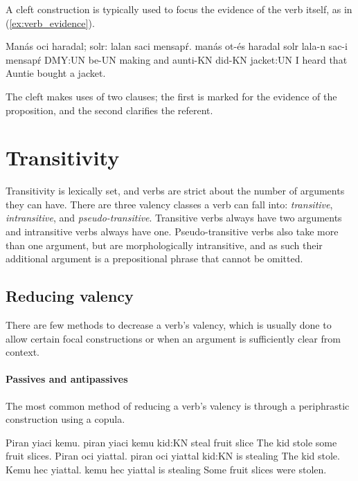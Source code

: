 A cleft construction is typically used to focus the evidence of the verb itself, as in (\ref{ex:verb_evidence}).

\begin{example}
	\label{ex:verb_evidence}
	\script Manás oci haradal; solr: lalan saci mensapŕ.
	\bits manás ot-és haradal solr lala-n sac-i mensapŕ
	\gloss DMY:UN be-UN making and aunti-KN did-KN jacket:UN
	\tr I heard that Auntie bought a jacket.
\end{example}

The cleft makes uses of two clauses; the first is marked for the evidence of the proposition, and the second clarifies the referent.

\section{Transitivity}
Transitivity is lexically set, and verbs are strict about the number of arguments they can have. There are three valency classes a verb can fall into: \emph{transitive}, \emph{intransitive}, and \emph{pseudo-transitive}. Transitive verbs always have two arguments and intransitive verbs always have one. Pseudo-transitive verbs also take more than one argument, but are morphologically intransitive, and as such their additional argument is a prepositional phrase that cannot be omitted. 

\subsection{Reducing valency}
There are few methods to decrease a verb's valency, which is usually done to allow certain focal constructions or when an argument is sufficiently clear from context.

\paragraph{Passives and antipassives} 
The most common method of reducing a verb's valency is through a periphrastic construction using a copula.

\begin{subexamples}
	\ex
		\script Piran yiaci kemu.
		\bits piran yiaci kemu
		\gloss kid:KN steal {fruit slice}
		\tr The kid stole some fruit slices.
	\ex \label{ex:antipassive}
		\script Piran oci yiattal.
		\bits piran oci yiattal
		\gloss kid:KN is stealing
		\tr The kid stole.
	\ex \label{ex:passive}
		\script Kemu hec yiattal.
		\bits kemu hec yiattal
		 is stealing
		\tr Some fruit slices were stolen.
\end{subexamples}

